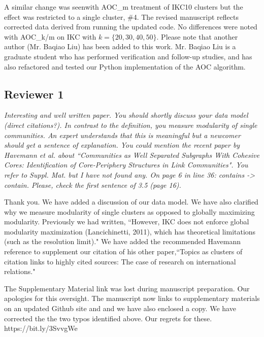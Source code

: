 \documentclass[11pt, oneside]{article}   	%
\begin{document}
\noindent A similar change was seenwith AOC\_m treatment of IKC10 clusters but the effect was restricted to a single cluster, \#4. The revised manuscript reflects corrected data derived from running the updated code. 
No differences were noted with AOC\_k/m on IKC with $k=\{20,30,40, 50\}$.  Please note that another author (Mr. Baqiao Liu) has been added to this work. Mr. Baqiao Liu is a graduate student who 
has performed verification and follow-up studies, and has also refactored and tested our Python implementation of the AOC algorithm.


\subsection*{Reviewer 1} \emph{Interesting and well written paper. You should shortly discuss your data model (direct citations?). In contrast to the definition, you measure modularity of single communities. An expert understands that this is meaningful but a newcomer should get a sentence of explanation.  You could mention the recent paper by Havemann et al. about ``Communities as Well Separated Subgraphs With Cohesive Cores: Identification of Core-Periphery Structures in Link Communities". You refer to Suppl. Mat. but I have not found any. On page 6 in line 36: contains -> contain. Please, check the first sentence of 3.5 (page 16).}

\vspace{2 mm}
Thank you. We have added a discussion of our data model. We have also clarified why we measure modularity of single clusters as opposed to globally maximizing modularity. Previously we had written, ``However, 
IKC does not enforce global modularity maximization (Lancichinetti, 2011), which has theoretical limitations (such as the resolution limit)." We have added the recommended  Havemann reference to supplement 
our citation of his other paper,``Topics as clusters of citation links to highly cited sources: The case of research on international relations." 

The Supplementary Material link was lost during manuscript preparation. Our apologies for this oversight. The manuscript now links to supplementary materials on an updated
Github site and and we have also enclosed a copy. We have corrected the the two typos identified above. Our regrets for these. \\

https://bit.ly/3SvvgWe\\

\clearpage
\end{document}

